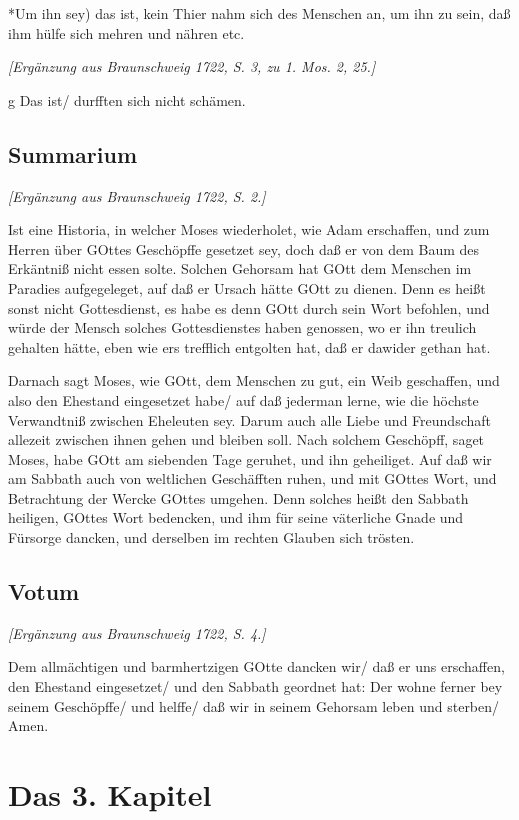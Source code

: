*Um ihn sey) das ist, kein Thier nahm sich des Menschen an, um ihn zu sein, daß ihm hülfe sich mehren und nähren etc.

\emph{[Ergänzung aus Braunschweig 1722, S. 3, zu 1. Mos. 2, 25.]}

g Das ist/ durfften sich nicht schämen.

\section{Summarium}

\emph{[Ergänzung aus Braunschweig 1722, S. 2.]}

Ist eine Historia, in welcher Moses wiederholet, wie Adam erschaffen, und zum Herren über GOttes Geschöpffe gesetzet sey, doch daß er von dem Baum des Erkäntniß nicht essen solte. Solchen Gehorsam hat GOtt dem Menschen im Paradies aufgegeleget, auf daß er Ursach hätte GOtt zu dienen. Denn es heißt sonst nicht Gottesdienst, es habe es denn GOtt durch sein Wort befohlen, und würde der Mensch solches Gottesdienstes haben genossen, wo er ihn treulich gehalten hätte, eben wie ers trefflich entgolten hat, daß er dawider gethan hat.

Darnach sagt Moses, wie GOtt, dem Menschen zu gut, ein Weib geschaffen, und also den Ehestand eingesetzet habe/ auf daß jederman lerne, wie die höchste Verwandtniß zwischen Eheleuten sey. Darum auch alle Liebe und Freundschaft allezeit zwischen ihnen gehen und bleiben soll. Nach solchem Geschöpff, saget Moses, habe GOtt am siebenden Tage geruhet, und ihn geheiliget. Auf daß wir am Sabbath auch von weltlichen Geschäfften ruhen, und mit GOttes Wort, und Betrachtung der Wercke GOttes umgehen. Denn solches heißt den Sabbath heiligen, GOttes Wort bedencken, und ihm für seine väterliche Gnade und Fürsorge dancken, und derselben im rechten Glauben sich trösten.

\section{Votum}

\emph{[Ergänzung aus Braunschweig 1722, S. 4.]}

Dem allmächtigen und barmhertzigen GOtte dancken wir/ daß er uns erschaffen, den Ehestand eingesetzet/ und den Sabbath geordnet hat: Der wohne ferner bey seinem Geschöpffe/ und helffe/ daß wir in seinem Gehorsam leben und sterben/ Amen.

\chapter{Das 3. Kapitel}

